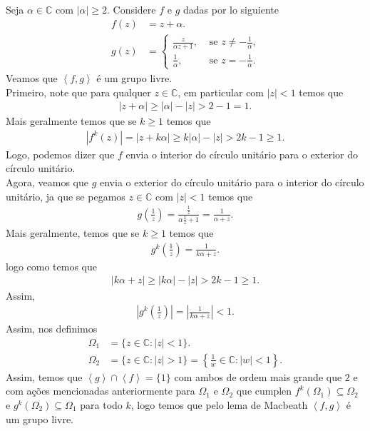 \begin{example}
  Seja $\alpha\in \mathbb{C}$ com $|\alpha|\geq 2$. Considere $f$ e $g$ dadas por lo siguiente
  \begin{align*}
    f(z)&=z+\alpha.\\
    g(z)&=\begin{cases}
      \frac{z}{\alpha z+1}, &\text{ se } z\neq-\frac{1}{\alpha}\text{,} \\
      \frac{1}{\alpha}, &\text{ se } z=-\frac{1}{\alpha}.
    \end{cases}
  \end{align*}
  Veamos que $\left\langle f,g \right\rangle$ é um grupo livre.\\
  Primeiro, note que para qualquer $z\in \mathbb{C}$, em particular com $|z|< 1$ temos que
  \begin{align*}
    |z+\alpha| \geq |\alpha|-|z| > 2-1=1.
  \end{align*}
  Mais geralmente temos que se $k\geq 1$ temos que 
  \begin{align*}
    |f^{k}(z)|=|z+k\alpha|\geq k|\alpha|-|z|> 2k-1\geq 1.
  \end{align*}
  Logo, podemos dizer que $f$ envia o interior do círculo unitário para o exterior do círculo unitário.\\
  Agora, veamos que $g$ envia o exterior do círculo unitário para o interior do círculo unitário, ja que se pegamos $z\in\mathbb{C}$ com $|z|< 1$ temos que 
  \begin{align*}
    g\left(\frac{1}{z} \right)=\frac{\frac{1}{z}}{\alpha\frac{1}{z}+1}=\frac{1}{\alpha+z}.
  \end{align*}
  Mais geralmente, temos que se $k\geq 1$ temos que
  \begin{align*}
    g^{k}\left( \frac{1}{z} \right)=\frac{1}{k\alpha+z}.
  \end{align*}
  logo como temos que
  \begin{align*}
    |k\alpha+z|\geq |k\alpha|-|z|>2k-1\geq 1.
  \end{align*}
  Assim,
  \begin{align*}
    \left| g^{k}\left( \frac{1}{z} \right) \right| = \left| \frac{1}{k\alpha+z} \right|< 1.
  \end{align*}
  Assim, nos definimos
  \begin{align*}
    \Omega_1&=\{z\in\mathbb{C}: |z|< 1\}.\\
    \Omega_2&=\{z\in\mathbb{C}: |z|> 1\}=\left\{\frac{1}{w}\in\mathbb{C}:|w|<1\right\}.
  \end{align*}
  Assim, temos que $\left\langle g \right\rangle\cap \left\langle f \right\rangle=\{1\}$ com ambos de ordem mais grande que $2$ e com ações mencionadas anteriormente para $\Omega_1$ e $\Omega_2$ que cumplen $f^{k}(\Omega_1)\subseteq \Omega_2$ e $g^{k}(\Omega_2)\subseteq \Omega_1$ para todo $k$, logo temos que pelo lema de Macbeath $\left\langle f,g \right\rangle$ é um grupo livre. 
\end{example}
